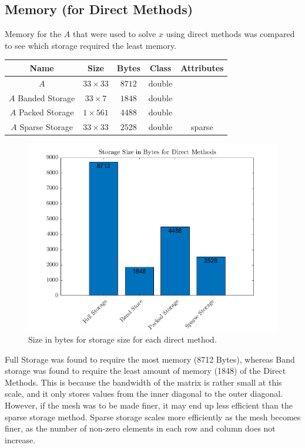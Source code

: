 \documentclass[12pt,a4paper]{article}
\begin{document}
\subsection{Memory (for Direct Methods)}
Memory for the $A$ that were used to solve $x$ using direct methods was compared to see which storage required the least memory.
\begin{center}
\begin{tabular}{c c c c c}
Name & Size & Bytes & Class & Attributes \\
\hline
$A$ & $33 \times 33$ & $8712$ & double & \\
$A$ Banded Storage & $33 \times 7$ & $1848$ & double & \\
$A$ Packed Storage & $1 \times 561$ & $4488$ & double & \\
$A$ Sparse Storage & $33 \times 33$ & $2528$ & double & sparse \\
\end{tabular}
\end{center}
\begin{figure}[H]
	\includegraphics[width=\linewidth]{images/MemoryGraph.png}
	\caption{Size in bytes for storage size for each direct method.}
	\label{fig:memory}
\end{figure}
Full Storage was found to require the most memory (8712 Bytes), whereas Band storage was found to require the least amount of memory (1848) of the Direct Methods. This is because the bandwidth of the matrix is rather small at this scale, and it only stores values from the inner diagonal to the outer diagonal. However, if the mesh was to be made finer, it may end up less efficient than the sparse storage method. Sparse storage scales more efficiently as the mesh becomes finer, as the number of non-zero elements in each row and column does not increase. 
\end{document}
